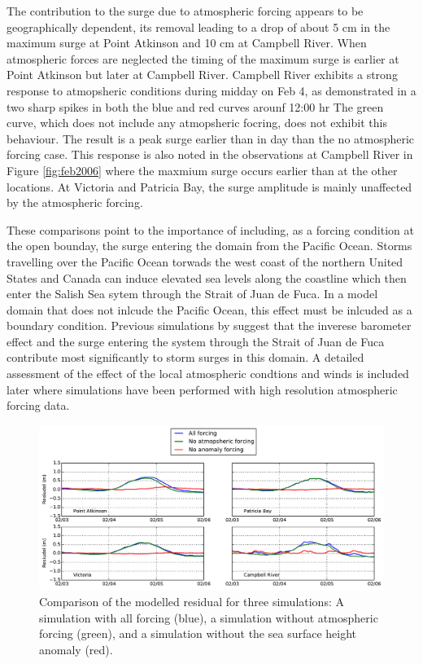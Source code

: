 \documentclass[pdftex,10pt]{article}
\begin{document}
The contribution to the surge due to atmospheric forcing appears to be geographically dependent, its removal leading to a drop of about 5 cm in the maximum surge at Point Atkinson and 10 cm at Campbell River. When atmospheric forces are neglected the timing of the maximum surge is earlier at Point Atkinson but later at Campbell River. Campbell River exhibits a strong response to atmopsheric conditions during midday on Feb 4, as demonstrated in a two sharp spikes in both the blue and red curves arounf 12:00 hr The green curve, which does not include any atmopsheric focring, does not exhibit this behaviour. The result is a peak surge earlier than in day than the no atmospheric forcing case. This response is also noted in the observations at Campbell River in Figure \ref{fig:feb2006} where the maxmium surge occurs earlier than at the other locations. At Victoria and Patricia Bay, the surge amplitude is mainly unaffected by the atmospheric forcing. 


These comparisons point to the importance of including, as a forcing condition at the open bounday, the surge entering the domain from the Pacific Ocean. Storms travelling over the Pacific Ocean torwads the west coast of the northern United States and Canada can induce elevated sea levels along the coastline which then enter the Salish Sea sytem through the Strait of Juan de Fuca. In a model domain that does not inlcude the Pacific Ocean, this effect must be inlcuded as a boundary condition. Previous simulations by \citet{murty1995storm} suggest that the inverese barometer effect and the surge entering the system through the Strait of Juan de Fuca contribute most significantly to storm surges in this domain.  A detailed assessment of the effect of the local atmospheric condtions and winds is included later where simulations have been performed with high resolution atmospheric forcing data.  

\begin{figure}
\centering
\includegraphics[scale=0.6]{Figures/feb2006_factors_bg.pdf}
\caption{Comparison of the modelled residual for three simulations: A simulation with all forcing (blue), a simulation without atmospheric forcing (green), and a simulation without the sea surface height anomaly (red). }
\label{fig:factors}
\end{figure}
\end{document}

